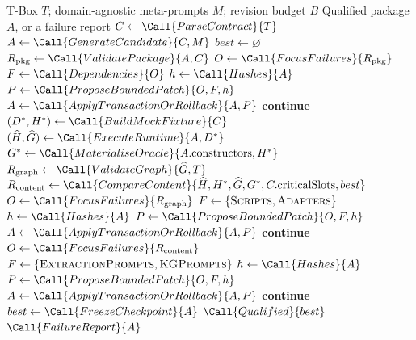 \begin{algorithm}[t]
\caption{Validated ontology-to-tools compilation and qualification}
\label{alg:ontology_to_tools}
\normalsize
\begin{algorithmic}[1]
\Require T-Box $T$; domain-agnostic meta-prompts $M$; revision budget $B$
\Ensure Qualified package $A$, or a failure report
\State $C \gets \Call{ParseContract}{T}$
\State $A \gets \Call{GenerateCandidate}{C,M}$
\State $best \gets \varnothing$
    \State $R_{\mathrm{pkg}} \gets \Call{ValidatePackage}{A,C}$
        \State $O \gets \Call{FocusFailures}{R_{\mathrm{pkg}}}$
        \State $F \gets \Call{Dependencies}{O}$
        \State $h \gets \Call{Hashes}{A}$
        \State $P \gets \Call{ProposeBoundedPatch}{O,F,h}$
        \State $A \gets \Call{ApplyTransactionOrRollback}{A,P}$
        \State \textbf{continue}
    \EndIf
    \State $(D^{\ast},H^{\ast}) \gets \Call{BuildMockFixture}{C}$
    \State $(\widehat{H},\widehat{G}) \gets \Call{ExecuteRuntime}{A,D^{\ast}}$
    \State $G^{\ast} \gets \Call{MaterialiseOracle}{A.\mathrm{constructors},H^{\ast}}$
    \State $R_{\mathrm{graph}} \gets \Call{ValidateGraph}{\widehat{G},T}$
    \State $R_{\mathrm{content}} \gets
        \Call{CompareContent}{\widehat{H},H^{\ast},\widehat{G},G^{\ast},C.\mathrm{criticalSlots},best}$
        \State $O \gets \Call{FocusFailures}{R_{\mathrm{graph}}}$
        \State $F \gets \{\textsc{Scripts},\textsc{Adapters}\}$
        \State $h \gets \Call{Hashes}{A}$
        \State $P \gets \Call{ProposeBoundedPatch}{O,F,h}$
        \State $A \gets \Call{ApplyTransactionOrRollback}{A,P}$
        \State \textbf{continue}
    \EndIf
        \State $O \gets \Call{FocusFailures}{R_{\mathrm{content}}}$
        \State $F \gets \{\textsc{ExtractionPrompts},\textsc{KGPrompts}\}$
        \State $h \gets \Call{Hashes}{A}$
        \State $P \gets \Call{ProposeBoundedPatch}{O,F,h}$
        \State $A \gets \Call{ApplyTransactionOrRollback}{A,P}$
        \State \textbf{continue}
    \EndIf
    \State $best \gets \Call{FreezeCheckpoint}{A}$
    \State \Return $\Call{Qualified}{best}$
\EndFor
\State \Return $\Call{FailureReport}{A}$
\end{algorithmic}
\end{algorithm}

